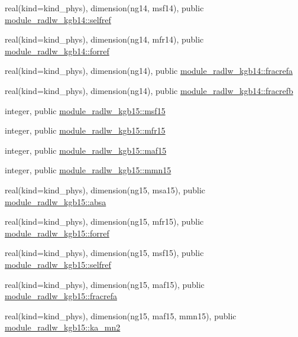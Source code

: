 \begin{DoxyCompactItemize}
\item 
real(kind=kind\+\_\+phys), dimension(ng14, msf14), public \hyperlink{group__module__radlw__main_ga0e390a41b1c9e2ece765d65774060bca}{module\+\_\+radlw\+\_\+kgb14\+::selfref}
\item 
real(kind=kind\+\_\+phys), dimension(ng14, mfr14), public \hyperlink{group__module__radlw__main_ga8478067cb8a07a02b56c09fa3c73eb67}{module\+\_\+radlw\+\_\+kgb14\+::forref}
\item 
real(kind=kind\+\_\+phys), dimension(ng14), public \hyperlink{group__module__radlw__main_gae1e7065b9ea30b36a3665ad594545e9b}{module\+\_\+radlw\+\_\+kgb14\+::fracrefa}
\item 
real(kind=kind\+\_\+phys), dimension(ng14), public \hyperlink{group__module__radlw__main_ga13a211bf8a903d0720fa72ac90e4fc3f}{module\+\_\+radlw\+\_\+kgb14\+::fracrefb}
\item 
integer, public \hyperlink{group__module__radlw__main_gae1b588ee60974c2d451c89f842601e07}{module\+\_\+radlw\+\_\+kgb15\+::msf15}
\item 
integer, public \hyperlink{group__module__radlw__main_gad4d78009d0c7ffa27dbb228e68307675}{module\+\_\+radlw\+\_\+kgb15\+::mfr15}
\item 
integer, public \hyperlink{group__module__radlw__main_ga482858cf08fb1a14117dfbaa6a57fe8c}{module\+\_\+radlw\+\_\+kgb15\+::maf15}
\item 
integer, public \hyperlink{group__module__radlw__main_ga8ab45999cfc7b9db0f3d3b61ccf803e8}{module\+\_\+radlw\+\_\+kgb15\+::mmn15}
\item 
real(kind=kind\+\_\+phys), dimension(ng15, msa15), public \hyperlink{group__module__radlw__main_gaa6412ac501e2afed3d1b64b0cdcdab9e}{module\+\_\+radlw\+\_\+kgb15\+::absa}
\item 
real(kind=kind\+\_\+phys), dimension(ng15, mfr15), public \hyperlink{group__module__radlw__main_gada70146d20f89f059141aa4cf58a0894}{module\+\_\+radlw\+\_\+kgb15\+::forref}
\item 
real(kind=kind\+\_\+phys), dimension(ng15, msf15), public \hyperlink{group__module__radlw__main_ga1d14e9b2e607f2022d84c6fc0cd27c4e}{module\+\_\+radlw\+\_\+kgb15\+::selfref}
\item 
real(kind=kind\+\_\+phys), dimension(ng15, maf15), public \hyperlink{group__module__radlw__main_ga4b5c5f6fd9ea806843adf78ec1b43cd2}{module\+\_\+radlw\+\_\+kgb15\+::fracrefa}
\item 
real(kind=kind\+\_\+phys), dimension(ng15, maf15, mmn15), public \hyperlink{group__module__radlw__main_gaff32d89fe8fef50ff79136cc7aa50526}{module\+\_\+radlw\+\_\+kgb15\+::ka\+\_\+mn2}

\end{DoxyCompactItemize}
